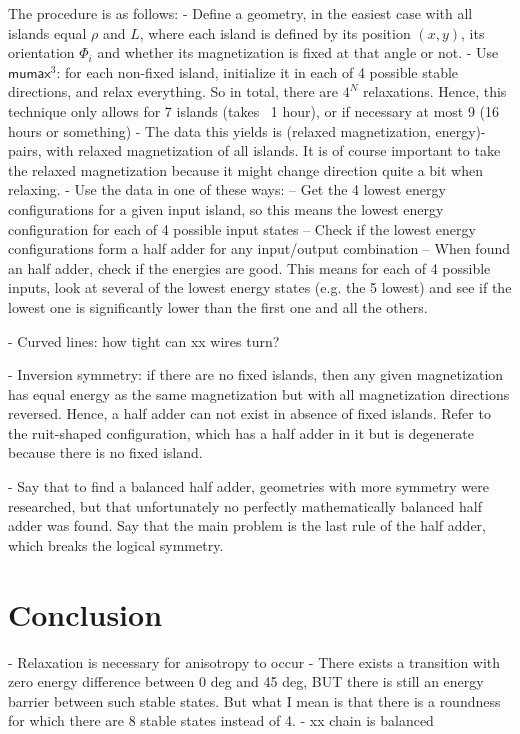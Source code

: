 \documentclass[11pt,a4paper,english]{article}
\newcommand{\mumax}{$\mathsf{mumax}^3$}
\begin{document}
The procedure is as follows:
- Define a geometry, in the easiest case with all islands equal $\rho$ and $L$, where each island is defined by its position $(x,y)$, its orientation $\Phi_i$ and whether its magnetization is fixed at that angle or not.
- Use \mumax{}: for each non-fixed island, initialize it in each of 4 possible stable directions, and relax everything. So in total, there are $4^N$ relaxations. Hence, this technique only allows for 7 islands (takes ~1 hour), or if necessary at most 9 (16 hours or something)
- The data this yields is (relaxed magnetization, energy)-pairs, with relaxed magnetization of all islands. It is of course important to take the relaxed magnetization because it might change direction quite a bit when relaxing.
- Use the data in one of these ways:
-- Get the 4 lowest energy configurations for a given input island, so this means the lowest energy configuration for each of 4 possible input states
-- Check if the lowest energy configurations form a half adder for any input/output combination
-- When found an half adder, check if the energies are good. This means for each of 4 possible inputs, look at several of the lowest energy states (e.g. the 5 lowest) and see if the lowest one is significantly lower than the first one and all the others.

- Curved lines: how tight can xx wires turn?

- Inversion symmetry: if there are no fixed islands, then any given magnetization has equal energy as the same magnetization but with all magnetization directions reversed. Hence, a half adder can not exist in absence of fixed islands. Refer to the ruit-shaped configuration, which has a half adder in it but is degenerate because there is no fixed island.

- Say that to find a balanced half adder, geometries with more symmetry were researched, but that unfortunately no perfectly mathematically balanced half adder was found. Say that the main problem is the last rule of the half adder, which breaks the logical symmetry.


\section{Conclusion}
- Relaxation is necessary for anisotropy to occur
- There exists a transition with zero energy difference between 0 deg and 45 deg, BUT there is still an energy barrier between such stable states. But what I mean is that there is a roundness for which there are 8 stable states instead of 4.
- xx chain is balanced


\newpage


\end{document}
